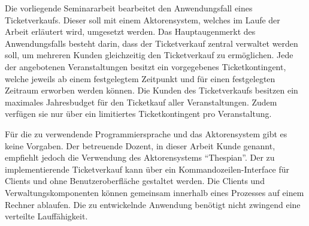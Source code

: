 
Die vorliegende Seminararbeit bearbeitet den Anwendungsfall eines Ticketverkaufs. 
Dieser soll mit einem Aktorensystem, welches im Laufe der Arbeit erläutert wird, umgesetzt werden.
Das Hauptaugenmerkt des Anwendungsfalls besteht darin, dass der Ticketverkauf zentral verwaltet werden soll, um mehreren Kunden gleichzeitig den Ticketverkauf zu ermöglichen.
Jede der angebotenen Veranstaltungen besitzt ein vorgegebenes Ticketkontingent, welche jeweils ab einem festgelegtem Zeitpunkt und für einen festgelegten Zeitraum erworben werden können.
Die Kunden des Ticketverkaufs besitzen ein maximales Jahresbudget für den Ticketkauf aller Veranstaltungen. Zudem verfügen sie nur über ein limitiertes Ticketkontingent pro Veranstaltung.

Für die zu verwendende Programmiersprache und das Aktorensystem gibt es keine Vorgaben.
Der betreuende Dozent, in dieser Arbeit Kunde genannt, empfiehlt jedoch die Verwendung des Aktorensystems \enquote{Thespian}.
Der zu implementierende Ticketverkauf kann über ein Kommandozeilen-Interface für Clients und ohne Benutzeroberfläche gestaltet werden.
Die Clients und Verwaltungskomponenten können gemeinsam innerhalb eines Prozesses auf einem Rechner ablaufen.
Die zu entwickelnde Anwendung benötigt nicht zwingend eine verteilte Lauffähigkeit.

